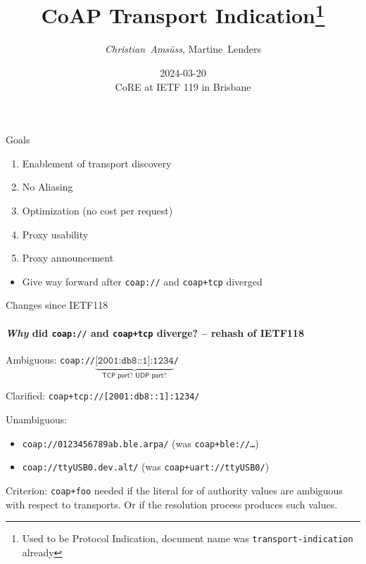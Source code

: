 

\title[CoAP Transport Indication]{CoAP Transport Indication\footnote{Used to be Protocol Indication, document name was \texttt{transport-indication} already}}
\subtitle{}
\author{\textit{Christian~Amsüss}, Martine~Lenders}
\date{2024-03-20 \\CoRE at IETF 119 in Brisbane}



\frame{\titlepage}

\begin{frame}{Goals}\Large
  \begin{enumerate}
    \item Enablement of transport discovery
    \item No Aliasing
    \item Optimization (no cost per request)
    \item Proxy usability
    \item Proxy announcement
  \end{enumerate}

  \bigskip

  \begin{itemize}
    \item Give way forward after \texttt{coap://} and \texttt{coap+tcp} diverged
  \end{itemize}
\end{frame}

\begin{frame}{Changes since IETF118}\large
  \framesubtitle{\textit{Why} did \texttt{coap://} and \texttt{coap+tcp} diverge? -- rehash of IETF118}

  Ambiguous: \texttt{coap://$\underbrace{\texttt{[2001:db8::1]:1234}}_{\textsf{TCP port? UDP port?}}$/}

  Clarified: \texttt{coap+tcp://[2001:db8::1]:1234/}

  \bigskip

  Unambiguous:
  \begin{itemize}
    \item \texttt{coap://0123456789ab.ble.arpa/} (was \texttt{coap+ble://\ldots})
    \item \texttt{coap://ttyUSB0.dev.alt/} (was \texttt{coap+uart://ttyUSB0/})
  \end{itemize}

  \bigskip

  Criterion: \texttt{coap+foo} needed if the literal for of authority values are ambiguous with respect to transports. Or if the resolution process produces such values.
\end{frame}


